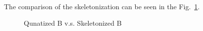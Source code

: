 \documentclass{article}
\begin{document}
The comparison of the skeletonization can be seen in the Fig.~\ref{fig:skeleton}.
\begin{figure}
\caption{Qunatized B v.s. Skeletonized B}\label{fig:skeleton}
\end{figure}
\end{document}
